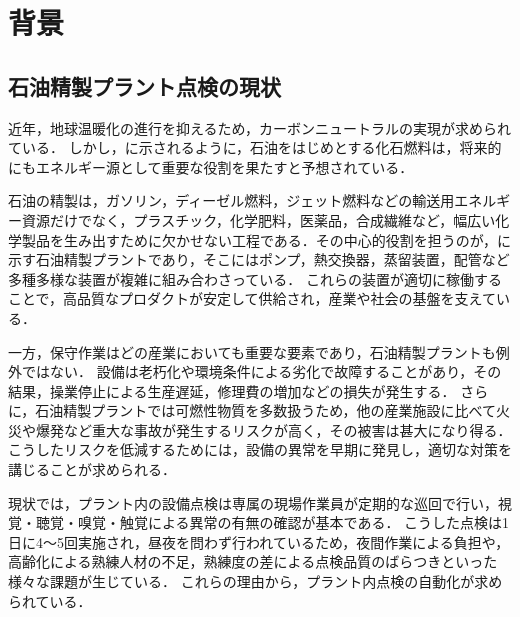 \documentclass[../main]{subfiles}
\begin{document}

\section{背景}
\label{sec:intro_background}
\subsection{石油精製プラント点検の現状}
\label{sec:intro_plant_current}


近年，地球温暖化の進行を抑えるため，カーボンニュートラルの実現が求められている．
しかし，に示されるように，石油をはじめとする化石燃料は，将来的にもエネルギー源として重要な役割を果たすと予想されている．\cite{ritchie2023energy}

石油の精製は，ガソリン，ディーゼル燃料，ジェット燃料などの輸送用エネルギー資源だけでなく，プラスチック，化学肥料，医薬品，合成繊維など，幅広い化学製品を生み出すために欠かせない工程である．その中心的役割を担うのが，に示す石油精製プラントであり，そこにはポンプ，熱交換器，蒸留装置，配管など多種多様な装置が複雑に組み合わさっている．\cite{eneos2024,Shvindin2008A}
これらの装置が適切に稼働することで，高品質なプロダクトが安定して供給され，産業や社会の基盤を支えている．

一方，保守作業はどの産業においても重要な要素であり，石油精製プラントも例外ではない．
設備は老朽化や環境条件による劣化で故障することがあり，その結果，操業停止による生産遅延，修理費の増加などの損失が発生する．
さらに，石油精製プラントでは可燃性物質を多数扱うため，他の産業施設に比べて火災や爆発など重大な事故が発生するリスクが高く，その被害は甚大になり得る．\cite{Tang2021}
こうしたリスクを低減するためには，設備の異常を早期に発見し，適切な対策を講じることが求められる．

現状では，プラント内の設備点検は専属の現場作業員が定期的な巡回で行い，視覚・聴覚・嗅覚・触覚による異常の有無の確認が基本である．
こうした点検は1日に4～5回実施され，昼夜を問わず行われているため，夜間作業による負担や，高齢化による熟練人材の不足，熟練度の差による点検品質のばらつきといった様々な課題が生じている．
これらの理由から，プラント内点検の自動化が求められている．
\end{document}
